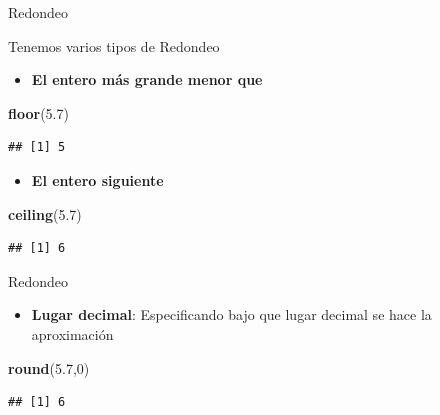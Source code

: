 \documentclass[ignorenonframetext,]{beamer}
\newenvironment{Shaded}{\begin{snugshade}}{\end{snugshade}}
\newcommand{\KeywordTok}[1]{\textcolor[rgb]{0.13,0.29,0.53}{\textbf{#1}}}
\newcommand{\DecValTok}[1]{\textcolor[rgb]{0.00,0.00,0.81}{#1}}
\newcommand{\FloatTok}[1]{\textcolor[rgb]{0.00,0.00,0.81}{#1}}
\newcommand{\NormalTok}[1]{#1}
\providecommand{\tightlist}{%
  \setlength{\itemsep}{0pt}\setlength{\parskip}{0pt}}
\begin{document}
\begin{frame}[fragile]{Redondeo}

Tenemos varios tipos de Redondeo

\begin{itemize}
\tightlist
\item
  \textbf{El entero más grande menor que}
\end{itemize}

\begin{Shaded}
\begin{Highlighting}[]
\KeywordTok{floor}\NormalTok{(}\FloatTok{5.7}\NormalTok{)}
\end{Highlighting}
\end{Shaded}

\begin{verbatim}
## [1] 5
\end{verbatim}

\begin{itemize}
\tightlist
\item
  \textbf{El entero siguiente}
\end{itemize}

\begin{Shaded}
\begin{Highlighting}[]
\KeywordTok{ceiling}\NormalTok{(}\FloatTok{5.7}\NormalTok{)}
\end{Highlighting}
\end{Shaded}

\begin{verbatim}
## [1] 6
\end{verbatim}

\end{frame}

\begin{frame}[fragile]{Redondeo}

\begin{itemize}
\tightlist
\item
  \textbf{Lugar decimal}: Especificando bajo que lugar decimal se hace
  la aproximación
\end{itemize}

\begin{Shaded}
\begin{Highlighting}[]
\KeywordTok{round}\NormalTok{(}\FloatTok{5.7}\NormalTok{,}\DecValTok{0}\NormalTok{)}
\end{Highlighting}
\end{Shaded}

\begin{verbatim}
## [1] 6
\end{verbatim}

\end{frame}
\end{document}
